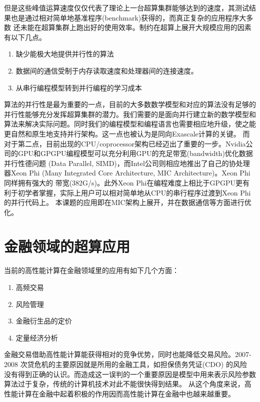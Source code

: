 但是这些峰值运算速度仅仅代表了理论上一台超算集群能够达到的速度，其测试结果也是通过相对简单地基准程序(benchmark)获得的，而真正复杂的应用程序大多数
还未能在超算集群上跑出好的使用效率。制约在超算上展开大规模应用的因素有以下几点。
\begin{enumerate}
    \item 缺少能极大地提供并行性的算法
	\item 数据间的通信受制于内存读取速度和处理器间的连接速度。
	\item 从串行编程模型转到并行编程的学习成本
\end{enumerate}
算法的并行性是最为重要的一点，目前的大多数数学模型和对应的算法没有足够的并行性能够充分发挥超算集群的潜力。我们需要的是面向并行建立新的数学模型和
算法来解决实际问题。同时我们的编程模型和编程语言也需要相应地升级，使之能更自然和原生地支持并行架构。这一点也被认为是同向Exascale计算的关键。
而对于第二点，目前出现的CPU/coprocessor架构已经迈出了重要的一步。Nvidia公司的GPU和GPGPU编程模型可以充分利用GPU的充足带宽(bandwidth)优化数据并行性德问题
(Data Parallel, SIMD)，而Intel公司则相应地推出了自己的协处理器Xeon Phi (Many Integrated Core Architecture, MIC Architecture)。Xeon Phi同样拥有强大的
带宽(382G/s)。此外Xeon Phi在编程难度上相比于GPGPU更有利于初学者掌握，实际上用户可以相对简单地从CPU的串行程序过渡到Xeon Phi的并行代码上。
本课题的应用即在MIC架构上展开，并在数据通信等方面进行优化。


\section{金融领域的超算应用} %
\label{sec:intro-finance}
当前的高性能计算在金融领域里的应用有如下几个方面：
\begin{enumerate}
\item 高频交易 
\item 风险管理 
\item 金融衍生品的定价 
\item 定量经济分析 
\end{enumerate}
金融交易借助高性能计算能获得相对的竞争优势，同时也能降低交易风险。2007-2008 次贷危机的主要原因就是所用的金融工具，如担保债务凭证(CDO) 的风险
没有得到正确的认识。而造成这一误判的一个重要原因是模型中用来表示风险参数算法过于复杂，传统的计算机技术对此不能很快得到结果。
从这个角度来说，高性能计算在金融中起着积极的作用因而高性能计算在金融中也越来越重要。

